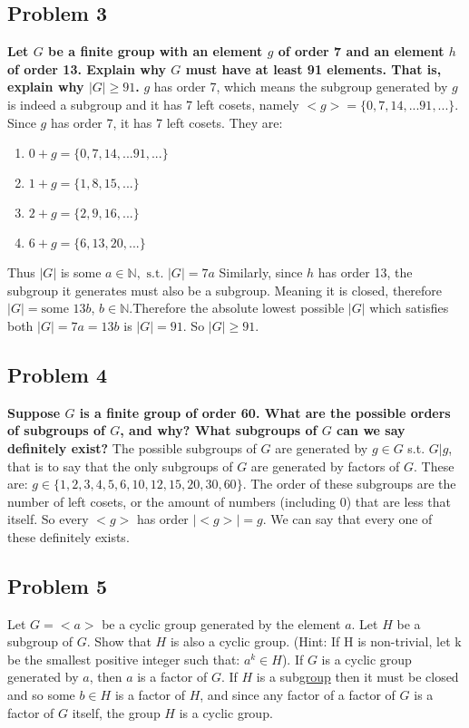 \documentclass[12pt]{article}
\newcommand{\N}{\mathbb{N}}
\newcommand\setItemnumber[1]{\setcounter{enumi}{\numexpr#1-1\relax}}
\begin{document}
\subsection{Problem 3}
\textbf{Let $G$ be a finite group with an element $g$ of order 7 and an element $h$ of order 13. Explain why $G$ must have at least 91 elements. That is, explain why $|G|\geq91$.}
\newline $g$ has order 7, which means the subgroup generated by $g$ is indeed a subgroup and it has 7 left cosets, namely $<g> =\{0,7,14,...91,...\}$. Since $g$ has order 7, it has 7 left cosets. They are:
\begin{enumerate}
    \item $0+g=\{0,7,14,...91,...\}$
    \item $1+g=\{1,8,15,...\}$
    \item $2+g=\{2,9,16,...\}$
    \newline\scalebox{1.5}{\qquad\vdots}
    \setItemnumber{7}
    \item $6+g=\{6,13,20,...\}$
\end{enumerate}
Thus $|G|$ is some $a\in\N,\text{ s.t. }|G|=7a$ \newline
Similarly, since $h$ has order 13, the subgroup it generates must also be a subgroup. Meaning it is closed, therefore $|G|= \text{some } 13b$, $b\in\N$.\newline Therefore the absolute lowest possible $|G|$ which satisfies both $|G|=7a=13b$ is $|G|=91$. So $|G|\geq91$.
\subsection{Problem 4}
\textbf{Suppose $G$ is a finite group of order 60. What are the possible orders of subgroups of $G$, and why? What subgroups of $G$ can we say definitely exist?}
\newline The possible subgroups of $G$ are generated by $g\in G$ s.t. $G|g$, that is to say that the only subgroups of $G$ are generated by factors of $G$. These are: $g\in\{1,2,3,4,5,6,10,12,15,20,30,60\}$. The order of these subgroups are the number of left cosets, or the amount of numbers (including 0) that are less that itself. So every $<g>$ has order $|<g>|=g$. We can say that every one of these definitely exists.
\subsection{Problem 5}
Let $G=<a>$ be a cyclic group generated by the element $a$. Let $H$ be a subgroup of $G$. Show that $H$ is also a cyclic group. (Hint: If H is non-trivial, let k be the smallest positive integer such that: $a^k\in H$).
\newline If $G$ is a cyclic group generated by $a$, then $a$ is a factor of $G$. If $H$ is a sub\underline{group} then it must be closed and so some $b\in H$ is a factor of $H$, and since any factor of a factor of $G$ is a factor of $G$ itself, the group $H$ is a cyclic group.
\end{document}
